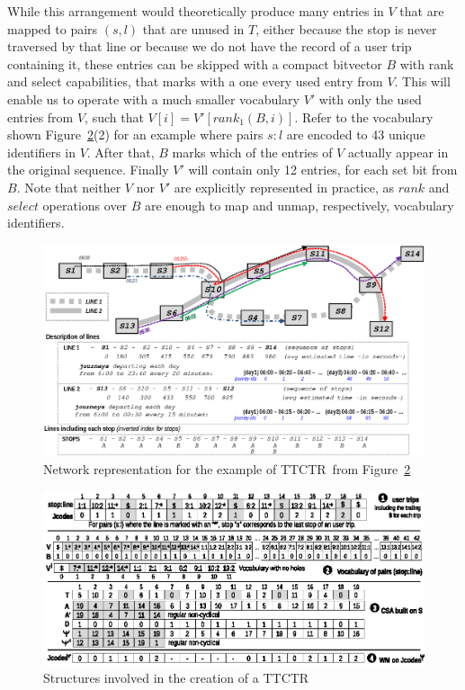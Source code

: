 \documentclass[runningheads]{llncs}
\newcommand{\ttctr}{TTCTR}
\begin{document}
While this arrangement would theoretically produce many entries in $V$ that are mapped to pairs $(s,l)$ that are unused in $T$, either because the stop is never traversed by that line or because we do not have the record of a user trip containing it, these entries can be skipped with a compact bitvector $B$ with rank and select capabilities, that marks with a one every used entry from $V$. This will enable us to operate with a much smaller vocabulary $V'$ with only the used entries from $V$, such that $V[i] = V'[rank_1(B,i)]$. Refer to the vocabulary shown Figure~\ref{fig:ttctr}(2) for an example where pairs $s:l$ are encoded to 43 unique identifiers in $V$. After that, $B$ marks which of the entries of $V$ actually appear in the original sequence. Finally $V'$ will contain only 12 entries, for each set bit from $B$. Note that neither $V$ nor $V'$ are explicitly represented in practice, as $rank$ and $select$ operations over $B$ are enough to map and unmap, respectively, vocabulary identifiers.

\begin{figure}
\includegraphics[width=\textwidth]{network.eps}
\caption{Network representation for the example of \ttctr~from Figure~\ref{fig:ttctr}}
\label{fig:example_trips_ttctr}
\end{figure}

\begin{figure}
    \includegraphics[width=1.00\textwidth]{ttctr2019.eps}
	\caption{Structures involved in the creation of a \ttctr}
	\label{fig:ttctr}
\end{figure}
\end{document}
